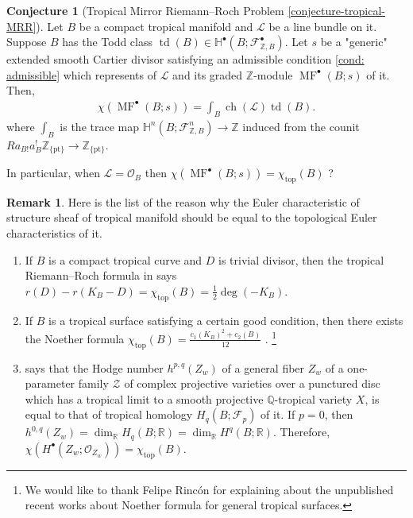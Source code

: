 \documentclass[a4paper,dvipdfmx,reqno,12pt]{amsart}
\theoremstyle{definition}
\newtheorem{conjecture}[theorem]{Conjecture}
\newtheorem{remark}[theorem]{Remark}
\newcommand{\Z}{\mathbb{Z}}%
\newcommand{\mb}[1]{\mathbb{#1}}%
\newcommand{\mcal}[1]{\mathcal{#1}}%
\newcommand{\opn}[1]{\operatorname{#1}}
\newcommand{\myfootnote}[1]{\hspace{-5pt}\footnote{#1}}
\numberwithin{equation}{section}
\begin{document}
\begin{conjecture}[{Tropical Mirror Riemann--Roch Problem
\cref{conjecture-tropical-MRR}}]
\label{conjecture-tropical-MRR-preface}
Let $B$ be a compact tropical manifold and $\mcal{L}$
be a line bundle on it. Suppose $B$ has the Todd class
$\opn{td}(B) \in \mb{H}^{\bullet}(B;\mcal{F}_{\Z, B}^{\bullet})$.
 Let $s$ be a "generic"
extended smooth Cartier divisor satisfying an admissible condition 
\cref{cond: admissible} which represents of $\mcal{L}$
and its graded $\Z$-module $\opn{MF}^{\bullet}(B;s)$
of it. Then,
\begin{align}
\chi(\opn{MF}^{\bullet}(B;s))=\int_B \opn{ch}(\mcal{L})\opn{td}(B).
\end{align}
where $\int_B$ is the trace map 
$\mb{H}^{n}(B;\mcal{F}_{\Z, B}^{n})\to \Z$
induced from the counit 
$Ra_{B!}a_{B}^{!}\mathbb{Z}_{\{\mathrm{pt}\}}
\to \mathbb{Z}_{\{\mathrm{pt}\}}$.

In particular, when $\mcal{L}=\mcal{O}_B$ then
$\chi(\opn{MF}^{\bullet}(B;s))=\chi_{\opn{top}}(B)$ ?
\end{conjecture}

\begin{remark}
Here is the list of the reason why the Euler 
characteristic of structure sheaf of tropical manifold
should be equal to the topological Euler characteristics of it.
\begin{enumerate}
\item If $B$ is a compact tropical curve and $D$ 
is trivial divisor, then the tropical Riemann--Roch 
formula in 
\cite{gathmannRiemannRochTheoremTropical2008a}
says $r(D)-r(K_B-D)=\chi_{\opn{top}}(B)=\frac{1}{2}\opn{deg}(-K_B)$. 
\item If $B$ is a tropical surface satisfying a certain 
good condition, then there exists the Noether formula
$\chi_{\opn{top}}(B)=\frac{c_1(K_B)^{2} +c_2(B)}{12}$ 
\cite[Theorem 5.1]{shawTropicalSurfaces2015a}.
\myfootnote{We would like to thank Felipe Rinc\'on 
for explaining about the unpublished recent works
about Noether formula for general tropical surfaces.
}
\item 
\cite[Corollary 2]{itenbergTropicalHomology2019b} says 
that the Hodge number $h^{p,q}(Z_w)$ of a general fiber $Z_w$ of
a one-parameter family $\mathcal{Z}$ of 
complex projective varieties over a punctured disc which 
has a tropical limit to a smooth projective 
$\mathbb{Q}$-tropical variety $X$, 
is equal to that of tropical homology 
$H_{q}(B;\mathcal{F}_p)$ of it. If $p=0$, then
$h^{0,q}(Z_w)=\dim_{\mathbb{R}}H_{q}(B;\mathbb{R})
=\dim_{\mathbb{R}} H^{q}(B;\mathbb{R})$.
Therefore, $\chi(H^{\bullet}(Z_w;\mathcal{O}_{Z_w}))=
\chi_{\opn{top}}(B)$.
\end{enumerate}

\end{remark}
\end{document}
